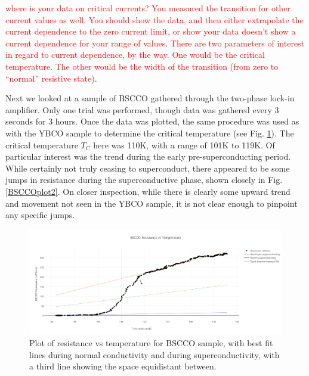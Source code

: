 \documentclass[prb,preprint]{revtex4-1}
\begin{document}
\textcolor{red}{where is your data on critical currents? You measured the transition for other current values as well. You should show the data, and then either extrapolate the current dependence to the zero current limit, or show your data doesn't show a current dependence for your range of values. There are two parameters of interest in regard to current dependence, by the way. One would be the critical temperature. The other would be the width of the transition (from zero to ``normal'' resistive state)}.  

Next we looked at a sample of BSCCO gathered through the two-phase lock-in amplifier. Only one trial was performed, though data was gathered every 3 seconds for 3 hours. Once the data was plotted, the same procedure was used as with the YBCO sample to determine the critical temperature (see Fig. \ref{BSCCOplot1}). The critical temperature $T_C$ here was 110K, with a range of 101K to 119K. Of particular interest was the trend during the early pre-superconducting period. While certainly not truly ceasing to superconduct, there appeared to be some jumps in resistance during the superconductive phase, shown closely in Fig. \ref{BSCCOplot2}. On closer inspection, while there is clearly some upward trend and movement not seen in the YBCO sample, it is not clear enough to pinpoint any specific jumps.

\begin{figure}[h!]
\centering
\includegraphics[width=7in]{bscco_resistance_vs_temperature.png}
\caption{Plot of resistance vs temperature for BSCCO sample, with best fit lines during normal conductivity and during superconductivity, with a third line showing the space equidistant between.}
\label{BSCCOplot1}
\end{figure}
\end{document}
